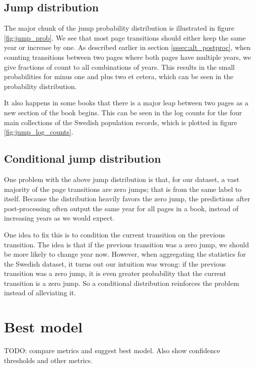 \subsection{Jump distribution}



The major chunk of the jump probability distribution is illustrated in figure \ref{fig:jump_prob}. We see that most page transitions should either keep the same year or increase by one.
As described earlier in section \ref{sssec:alt_postproc}, when counting transitions between two pages where both pages have multiple years, we give fractions of count to all combinations of years. This results in the small probabilities for minus one and plus two et cetera, which can be seen in the probability distribution.

It also happens in some books that there is a major leap between two pages as a new section of the book begins. This can be seen in the log counts for the four main collections of the Swedish population records, which is plotted in figure \ref{fig:jump_log_counts}.

\subsection{Conditional jump distribution}
One problem with the above jump distribution is that, for our dataset, a vast majority of the page transitions are zero jumps; that is from the same label to itself.
Because the distribution heavily favors the zero jump, the predictions after post-processing often output the same year for all pages in a book, instead of increasing years as we would expect.

 One idea to fix this is to condition the current transition on the previous transition. The idea is that if the previous transition was a zero jump, we should be more likely to change year now. However, when aggregating the statistics for the Swedish dataset, it turns out our intuition was wrong: if the previous transition was a zero jump, it is even greater probability that the current transition is a zero jump. So a conditional distribution reinforces the problem instead of alleviating it.


\section{Best model}

TODO: compare metrics and suggest best model. Also show confidence thresholds and other metrics.
